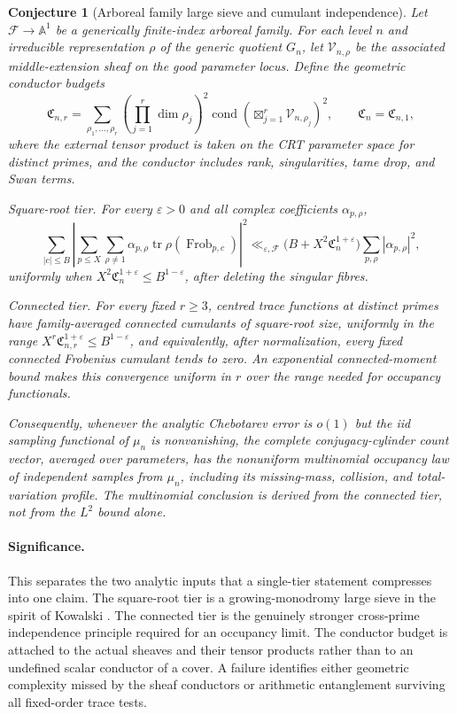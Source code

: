 \documentclass[11pt]{article}
\newtheorem{conjecture}{Conjecture}
\newcommand{\eps}{\varepsilon}
\begin{document}
\begin{conjecture}[Arboreal family large sieve and cumulant independence]\label{c17}
Let $\mathcal F\to\mathbb A^1$ be a generically finite-index arboreal family.  For each
level $n$ and irreducible representation $\rho$ of the generic quotient $G_n$, let
$\mathcal V_{n,\rho}$ be the associated middle-extension sheaf on the good parameter
locus.  Define the geometric conductor budgets
\[
 \mathfrak C_{n,r}=
 \sum_{\rho_1,\ldots,\rho_r}
 \left(\prod_{j=1}^r\dim\rho_j\right)^2
 \operatorname{cond}\!\left(\boxtimes_{j=1}^r\mathcal V_{n,\rho_j}\right)^2,
 \qquad \mathfrak C_n=\mathfrak C_{n,1},
\]
where the external tensor product is taken on the CRT parameter space for distinct
primes, and the conductor includes rank, singularities, tame drop, and Swan terms.

\emph{Square-root tier.}  For every $\eps>0$ and all complex coefficients
$\alpha_{p,\rho}$,
\[
 \sum_{|c|\le B}
 \left|\sum_{p\le X}\sum_{\rho\ne1}
  \alpha_{p,\rho}\operatorname{tr}
  \rho(\operatorname{Frob}_{p,c})\right|^2
 \ll_{\eps,\mathcal F}
 \bigl(B+X^2\mathfrak C_n^{1+\eps}\bigr)
 \sum_{p,\rho}|\alpha_{p,\rho}|^2,
\]
uniformly when $X^2\mathfrak C_n^{1+\eps}\le B^{1-\eps}$, after deleting the
singular fibres.

\emph{Connected tier.}  For every fixed $r\ge3$, centred trace functions at distinct
primes have family-averaged connected cumulants of square-root size, uniformly in the
range $X^r\mathfrak C_{n,r}^{1+\eps}\le B^{1-\eps}$, and equivalently, after normalization,
every fixed connected Frobenius cumulant tends to zero.  An exponential connected-moment
bound makes this convergence uniform in $r$ over the range needed for occupancy
functionals.

Consequently, whenever the analytic Chebotarev error is $o(1)$ but the iid sampling
functional of $\mu_n$ is nonvanishing, the complete conjugacy-cylinder count vector,
averaged over parameters, has the nonuniform multinomial occupancy law of independent
samples from $\mu_n$, including its missing-mass, collision, and total-variation profile.
The multinomial conclusion is derived from the connected tier, not from the $L^2$ bound
alone.
\end{conjecture}

\paragraph{Significance.}
This separates the two analytic inputs that a single-tier statement compresses into one
claim.  The square-root tier is a growing-monodromy large sieve in the spirit of
Kowalski \cite{KowalskiSieve}.  The connected tier is the genuinely stronger
cross-prime independence principle required for an occupancy limit.  The conductor
budget is attached to the actual sheaves and their tensor products rather than to an
undefined scalar conductor of a cover.  A failure identifies either geometric
complexity missed by the sheaf conductors or arithmetic entanglement surviving all
fixed-order trace tests.
\end{document}
